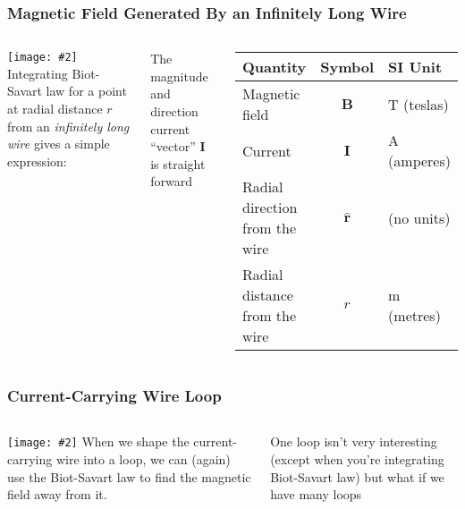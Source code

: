 \documentclass[12pt,aspectratio=169]{beamer}
\newcommand{\pic}[2]{\texttt{[image: \#2]}}
\newcommand{\mb}[1]{\mathbf{#1}}
\newcommand{\eq}[2]{\vspace{#1}{\Large\begin{displaymath}#2\end{displaymath}}}
\begin{document}
\begin{frame}
  \frametitle{Magnetic Field Generated By an Infinitely Long Wire}
  \begin{columns}
    \pic{1}{magcur2.png}
    Integrating Biot-Savart law for a point at radial distance $r$ from an
    \emph{infinitely long wire} gives a simple expression:

    \eq{-.35in}{
      \boxed{\mb{B}=\frac{\mu_0(\mb{I}\times\mb{\hat{r})}}{2\pi r}}
      \quad\text{or}\quad
      \boxed{B=\frac{\mu_0I}{2\pi r}}
    }

    \vspace{-.15in}The magnitude and direction current ``vector'' $\mb{I}$ is
    straight forward

    \vspace{-.3in}
    \begin{center}
      \begin{tabular}{l|c|l}
        \rowcolor{pink}
        \textbf{Quantity} & \textbf{Symbol} & \textbf{SI Unit} \\ \hline
        Magnetic field      & $\mb{B}$ & \si{T} (teslas)\\
        Current             & $\mb{I}$ & \si{A} (amperes)\\
        Radial direction from the wire & $\mb{\hat{r}}$ & (no units)\\
        Radial distance from the wire  & $r$            & \si{m} (metres)\\
      \end{tabular}
    \end{center}
  \end{columns}
\end{frame}


\begin{frame}
  \frametitle{Current-Carrying Wire Loop}
  \begin{columns}
    \pic{1}{curloo.png}
    When we shape the current-carrying wire into a loop, we can (again) use
    the Biot-Savart law to find the magnetic field away from it.

    \vspace{.2in}
    One loop isn't very interesting (except when you're integrating Biot-Savart
    law) but what if we have many loops
  \end{columns}
\end{frame}
\end{document}
